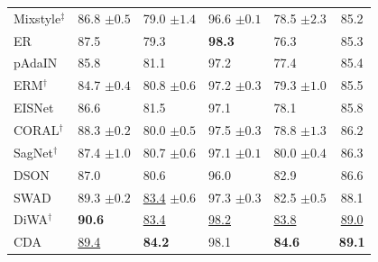 \documentclass[10pt]{article}
\begin{document}
\begin{table}[H]
\begin{tabular}{lllll|c}
Mixstyle$^\ddagger$ & 86.8 \scriptsize$\pm0.5$ & 79.0 \scriptsize$\pm1.4$ & 96.6 \scriptsize$\pm0.1$ & 78.5 \scriptsize$\pm2.3$ & 85.2 \\
ER & 87.5 & 79.3 & \textbf{98.3} & 76.3 & 85.3 \\
pAdaIN & 85.8 & 81.1 & 97.2 & 77.4 & 85.4 \\
ERM$^\dagger$ & 84.7 \scriptsize$\pm0.4$ & 80.8 \scriptsize$\pm0.6$ & 97.2 \scriptsize$\pm0.3$ & 79.3 \scriptsize$\pm1.0$ & 85.5 \\
EISNet & 86.6 & 81.5 & 97.1 & 78.1 & 85.8 \\
CORAL$^\dagger$ & 88.3 \scriptsize$\pm0.2$ & 80.0 \scriptsize$\pm0.5$ & 97.5 \scriptsize$\pm0.3$ & 78.8 \scriptsize$\pm1.3$ & 86.2 \\
SagNet$^\dagger$ & 87.4 \scriptsize$\pm1.0$ & 80.7 \scriptsize$\pm0.6$ & 97.1 \scriptsize$\pm0.1$ & 80.0 \scriptsize$\pm0.4$ & 86.3 \\
DSON & 87.0 & 80.6 & 96.0 & 82.9 & 86.6 \\
SWAD & 89.3 \scriptsize$\pm0.2$ & \underline{83.4} \scriptsize$\pm0.6$ & 97.3 \scriptsize$\pm0.3$ & 82.5 \scriptsize$\pm0.5$ & 88.1 \\
DiWA$^\dagger$ & \textbf{90.6} & \underline{83.4} & \underline{98.2} & \underline{83.8} & \underline{89.0} \\
\midrule
CDA & \underline{89.4} & \textbf{84.2} & 98.1 & \textbf{84.6} & \textbf{89.1} \\
\bottomrule
\end{tabular}
\end{table}

\clearpage
\end{document}
